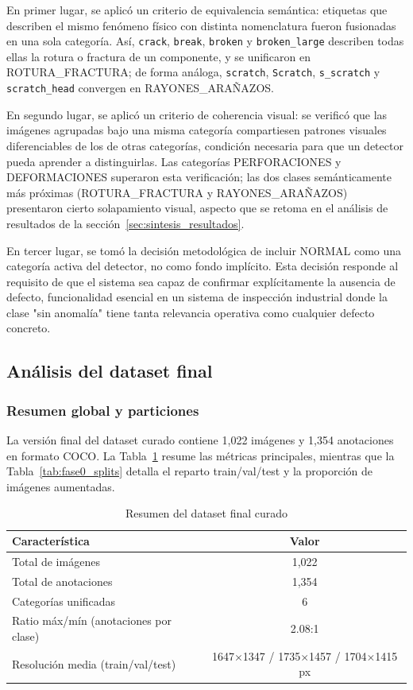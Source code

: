 En primer lugar, se aplicó un criterio de equivalencia semántica: etiquetas que describen el mismo fenómeno físico con distinta nomenclatura fueron fusionadas en una sola categoría. Así, \texttt{crack}, \texttt{break}, \texttt{broken} y \texttt{broken\_large} describen todas ellas la rotura o fractura de un componente, y se unificaron en \mbox{ROTURA\_FRACTURA}; de forma análoga, \texttt{scratch}, \texttt{Scratch}, \texttt{s\_scratch} y \texttt{scratch\_head} convergen en \mbox{RAYONES\_ARAÑAZOS}.

En segundo lugar, se aplicó un criterio de coherencia visual: se verificó que las imágenes agrupadas bajo una misma categoría compartiesen patrones visuales diferenciables de los de otras categorías, condición necesaria para que un detector pueda aprender a distinguirlas. Las categorías PERFORACIONES y DEFORMACIONES superaron esta verificación; las dos clases semánticamente más próximas (\mbox{ROTURA\_FRACTURA} y \mbox{RAYONES\_ARAÑAZOS}) presentaron cierto solapamiento visual, aspecto que se retoma en el análisis de resultados de la sección~\ref{sec:sintesis_resultados}.

En tercer lugar, se tomó la decisión metodológica de incluir NORMAL como una categoría activa del detector, no como fondo implícito. Esta decisión responde al requisito de que el sistema sea capaz de confirmar explícitamente la ausencia de defecto, funcionalidad esencial en un sistema de inspección industrial donde la clase "sin anomalía" tiene tanta relevancia operativa como cualquier defecto concreto.

\subsection{Análisis del dataset final}

\subsubsection{Resumen global y particiones}

La versión final del dataset curado contiene 1{,}022 imágenes y 1{,}354 anotaciones en formato COCO. La Tabla~\ref{tab:fase0_resumen_dataset_final} resume las métricas principales, mientras que la Tabla~\ref{tab:fase0_splits} detalla el reparto train/val/test y la proporción de imágenes aumentadas.

\begin{table}[htbp]
\centering
\begin{tabular}{lc}
\toprule
\textbf{Característica} & \textbf{Valor} \\
\midrule
Total de imágenes & 1{,}022 \\
Total de anotaciones & 1{,}354 \\
Categorías unificadas & 6 \\
Ratio máx/mín (anotaciones por clase) & 2.08:1 \\
Resolución media (train/val/test) & 1647$\times$1347 / 1735$\times$1457 / 1704$\times$1415 px \\
\bottomrule
\end{tabular}
\caption{Resumen del dataset final curado}
\label{tab:fase0_resumen_dataset_final}
\end{table}

